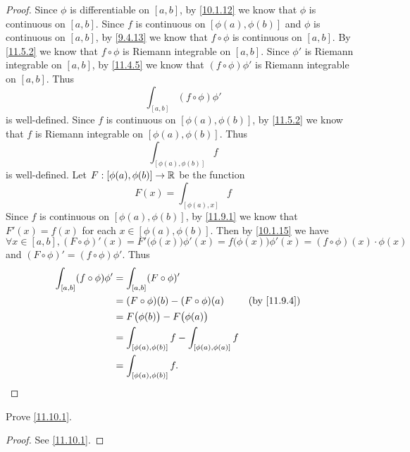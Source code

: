 \begin{proof}
  Since \(\phi\) is differentiable on \([a, b]\), by \cref{10.1.12} we know that \(\phi\) is continuous on \([a, b]\).
  Since \(f\) is continuous on \([\phi(a), \phi(b)]\) and \(\phi\) is continuous on \([a, b]\), by \cref{9.4.13} we know that \(f \circ \phi\) is continuous on \([a, b]\).
  By \cref{11.5.2} we know that \(f \circ \phi\) is Riemann integrable on \([a, b]\).
  Since \(\phi'\) is Riemann integrable on \([a, b]\), by \cref{11.4.5} we know that \((f \circ \phi) \phi'\) is Riemann integrable on \([a, b]\).
  Thus
  \[
    \int_{[a, b]} (f \circ \phi) \phi'
  \]
  is well-defined.
  Since \(f\) is continuous on \([\phi(a), \phi(b)]\), by \cref{11.5.2} we know that \(f\) is Riemann integrable on \([\phi(a), \phi(b)]\).
  Thus
  \[
    \int_{[\phi(a), \phi(b)]} f
  \]
  is well-defined.
  Let \(F : [\phi(a), \phi(b)] \to \mathbb{R}\) be the function
  \[
    F(x) = \int_{[\phi(a), x]} f
  \]
  Since \(f\) is continuous on \([\phi(a), \phi(b)]\), by \cref{11.9.1} we know that \(F'(x) = f(x)\) for each \(x \in [\phi(a), \phi(b)]\).
  Then by \cref{10.1.15} we have
  \[
    \forall x \in [a, b], (F \circ \phi)'(x) = F'\big(\phi(x)\big) \phi'(x) = f\big(\phi(x)\big) \phi'(x) = (f \circ \phi)(x) \cdot \phi(x)
  \]
  and \((F \circ \phi)' = (f \circ \phi) \phi'\).
  Thus
  \begin{align*}
    \int_{[a, b]} (f \circ \phi) \phi' & = \int_{[a, b]} (F \circ \phi)'                                              \\
                                       & = (F \circ \phi)(b) - (F \circ \phi)(a)                     &  & \by{11.9.4} \\
                                       & = F\big(\phi(b)\big) - F\big(\phi(a)\big)                                    \\
                                       & = \int_{[\phi(a), \phi(b)]} f - \int_{[\phi(a), \phi(a)]} f                  \\
                                       & = \int_{[\phi(a), \phi(b)]} f.
  \end{align*}
\end{proof}

\exercisesection

\begin{ex}\label{ex:11.10.1}
  Prove \cref{11.10.1}.
\end{ex}

\begin{proof}
  See \cref{11.10.1}.
\end{proof}

